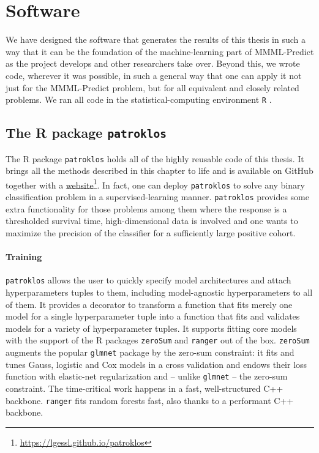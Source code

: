 \section{Software}

We have designed the software that generates the results of this thesis in such a way that it 
can be the foundation of the machine-learning part of MMML-Predict as the project develops and 
other researchers take over. Beyond this, we wrote code, wherever it was possible, in such 
a general way that one can apply it not just for the MMML-Predict problem, but for all equivalent 
and closely related problems. We ran all code in the statistical-computing environment \texttt{R}
\cite{r-language}.

\subsection{The R package \texttt{patroklos}}
The R package \texttt{patroklos} holds all of the highly reusable code of this thesis. It brings 
all the methods described in this chapter to life and is available on GitHub \cite{patroklos-gh} 
together with a 
\href{https://lgessl.github.io/patroklos/}{website}\footnote{\url{https://lgessl.github.io/patroklos}}. 
In fact, one can deploy 
\texttt{patroklos} to solve any binary classification problem in a supervised-learning manner.
\texttt{patroklos} provides some extra functionality for those problems among them where the 
response is a thresholded survival time, high-dimensional data is involved and one wants to maximize 
the precision of the classifier for a sufficiently large positive cohort.

\paragraph{Training} 
\texttt{patroklos} allows the user to quickly specify model architectures and 
attach hyperparameters tuples to them, including model-agnostic hyperparameters to all of them. It 
provides a decorator to transform a function that fits merely one model for a single hyperparameter 
tuple into a function that fits and validates models for a variety of hyperparameter tuples. 
It supports fitting core models with the support of the R packages \texttt{zeroSum} 
\cite{zerosumR} and \texttt{ranger} \cite{ranger17} out of the box. \texttt{zeroSum} 
augments the popular \texttt{glmnet} package by the zero-sum constraint: it fits and 
tunes Gauss, logistic and Cox models in a cross validation and endows their loss function 
with elastic-net regularization and -- unlike \texttt{glmnet} -- the zero-sum 
constraint. The time-critical work happens in a fast, well-structured C++ backbone. 
\texttt{ranger} fits random forests fast, also thanks to a performant C++ backbone. 

